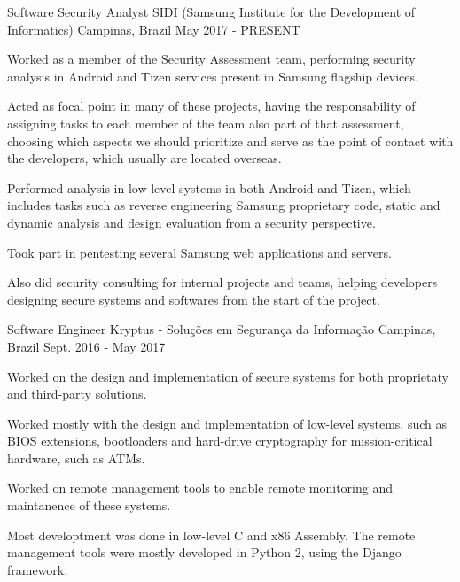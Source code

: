 

\begin{cventries}

  \cventry
    {Software Security Analyst} %
    {SIDI (Samsung Institute for the Development of Informatics)} %
    {Campinas, Brazil} %
    {May 2017 - PRESENT} %
    {
      \begin{cvitems} %
        \item {Worked as a member of the Security Assessment team, performing security analysis in Android and Tizen services present in Samsung flagship devices.}
        \item {Acted as focal point in many of these projects, having the responsability of assigning tasks to each member of the team also part of that assessment, choosing which aspects we should prioritize and serve as the point of contact with the developers, which usually are located overseas.}
        \item {Performed analysis in low-level systems in both Android and Tizen, which includes tasks such as reverse engineering Samsung proprietary code, static and dynamic analysis and design evaluation from a security perspective.}
        \item {Took part in pentesting several Samsung web applications and servers.}
        \item {Also did security consulting for internal projects and teams, helping developers designing secure systems and softwares from the start of the project. }
      \end{cvitems}
    }

  \cventry
    {Software Engineer} %
    {Kryptus - Soluções em Segurança da Informação} %
    {Campinas, Brazil} %
    {Sept. 2016 - May 2017} %
    {
      \begin{cvitems} %
        \item {Worked on the design and implementation of secure systems for both proprietaty and third-party solutions.}
        \item {Worked mostly with the design and implementation of low-level systems, such as BIOS extensions, bootloaders and hard-drive cryptography for mission-critical hardware, such as ATMs.}
        \item {Worked on remote management tools to enable remote monitoring and maintanence of these systems.}
        \item {Most developtment was done in low-level C and x86 Assembly. The remote management tools were mostly developed in Python 2, using the Django framework.}
      \end{cvitems}
    }


\end{cventries}
